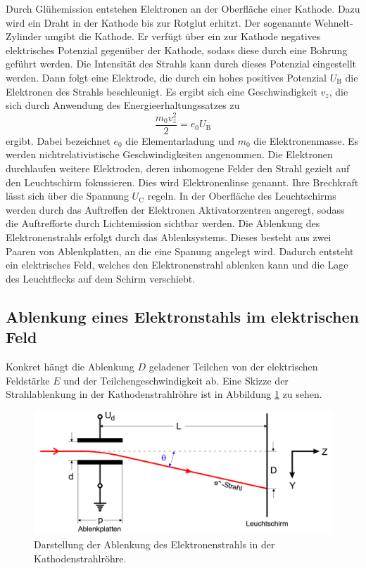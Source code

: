 Durch Glühemission entstehen Elektronen an der Oberfläche einer Kathode. Dazu
wird ein Draht in der Kathode bis zur Rotglut erhitzt. Der sogenannte Wehnelt-Zylinder
umgibt die Kathode. Er verfügt über ein zur Kathode negatives elektrisches Potenzial
gegenüber der Kathode, sodass diese durch eine Bohrung geführt werden. Die Intensität
des Strahls kann durch dieses Potenzial eingestellt werden.
Dann folgt eine Elektrode, die durch ein hohes positives Potenzial $U_\text{B}$
die Elektronen des Strahls beschleunigt. Es ergibt sich eine Geschwindigkeit $v_z$,
die sich durch Anwendung des Energieerhaltungssatzes zu
\begin{equation}
  \frac{m_0 v_z^2}{2} = e_0 U_\text{B}
  \label{eqn:energie}
\end{equation}
ergibt. Dabei bezeichnet $e_0$ die Elementarladung und $m_0$ die Elektronenmasse.
Es werden nichtrelativistische Geschwindigkeiten angenommen.
Die Elektronen durchlaufen weitere Elektroden, deren inhomogene Felder den Strahl
gezielt auf den Leuchtschirm fokussieren. Dies wird Elektronenlinse genannt. Ihre
Brechkraft lässt sich über die Spannung $U_\text{C}$ regeln. In der Oberfläche des Leuchtschirms
werden durch das Auftreffen der Elektronen Aktivatorzentren angeregt, sodass die
Auftrefforte durch Lichtemission sichtbar werden.
Die Ablenkung des Elektronenstrahls erfolgt durch das Ablenksystems. Dieses besteht aus
zwei Paaren von Ablenkplatten, an die eine Spanung angelegt wird. Dadurch entsteht ein elektrisches
Feld, welches den Elektronenstrahl ablenken kann und die Lage des Leuchtflecks auf
dem Schirm verschiebt.

\subsection{Ablenkung eines Elektronstahls im elektrischen Feld}
\label{subsec:Ablenkungtheorie}
Konkret hängt die Ablenkung $D$ geladener Teilchen von der elektrischen Feldstärke $E$
und der Teilchengeschwindigkeit ab.
Eine Skizze der Strahlablenkung in der Kathodenstrahlröhre ist in Abbildung \ref{fig:ablenkungtheorie}
zu sehen.

\begin{figure}[H]
  \centering
  \includegraphics[width=350pt]{data/strahlablenkung.png}
  \caption{Darstellung der Ablenkung des Elektronenstrahls in der Kathodenstrahlröhre.\cite{Versuchsanleitung501}}
  \label{fig:ablenkungtheorie}
\end{figure}


